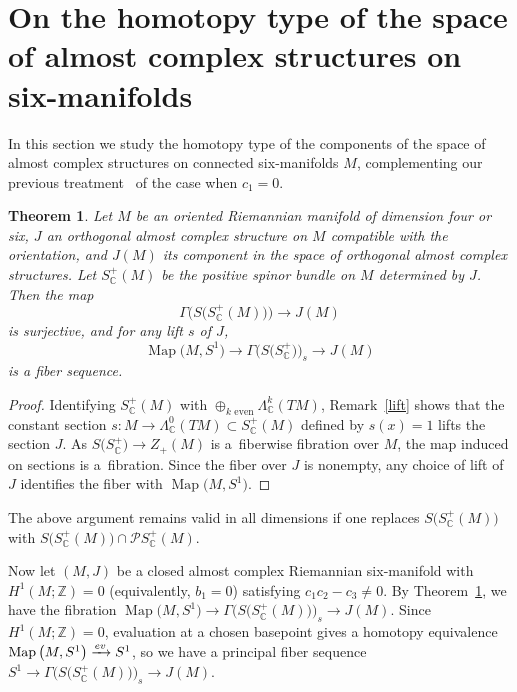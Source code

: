 \documentclass[11pt]{article}
\numberwithin{equation}{section}
\newcommand{\ZZ}{\mathbb{Z}}
\newcommand{\C}{\mathbb{C}}
\DeclareMathOperator{\Map}{Map}
\numberwithin{equation}{section}
\newtheorem{Theorem}{Theorem}[section]
\begin{document}
\setcounter{section}{3}
\section[On the homotopy type of the space of almost complex structures on six-manifolds]{On the homotopy type of the space\\ of almost complex structures on six-manifolds}

In this section we study the homotopy type of the components of the space of almost complex structures on connected six-manifolds $M$, complementing our previous treatment~\cite{FGM21} of the case when $c_1=0$.

\begin{Theorem}\label{fibration}
Let $M$ be an oriented Riemannian manifold of dimension four or six, $J$ an orthogonal almost complex structure on $M$ compatible with the orientation, and $J(M)$ its component in the space of orthogonal almost complex structures. Let $S_{\C}^+(M)$ be the positive spinor bundle on $M$ determined by $J$. Then the map
\[
\Gamma\big( S\big(S_\C^+(M)\big)\big) \to J(M)
\]
is surjective, and for any lift $s$ of $J$,
\[
\Map\big(M,S^1\big) \to \Gamma\big( S\big(S_\C^+\big)\big)_s \to J(M)
\]
is a fiber sequence.
\end{Theorem}
\begin{proof}
Identifying $S_\C^+(M)$ with $\oplus_{k \text{ even}} \Lambda^k_\C(TM)$, Remark~\ref{lift} shows that
the constant section $s \colon M \to \Lambda^0_\C(TM) \subset S_\C^+(M)$ defined by
$s(x)=1$ lifts the section $J$. As $S\big(S_\C^+\big) \to Z_+(M)$ is a~fiberwise fibration over $M$, the map induced on sections is a~fibration. Since the fiber over $J$ is nonempty, any choice of lift of $J$ identifies the
fiber with $\Map\big(M,S^1\big)$.
\end{proof}

\begin{Remark} The above argument remains valid in all dimensions if one replaces $S\big(S_{\C}^+(M)\big)$ with $S\big(S_{\C}^+(M)\big) \cap {\mathcal P}S ^+_{\C}(M)$. \end{Remark}

Now let $(M,J)$ be a closed almost complex Riemannian six-manifold with $H^1(M;\ZZ) = 0$ (equivalently, $b_1 = 0$) satisfying $c_1c_2 - c_3 \neq 0$. By Theorem~\ref{fibration}, we have the fibration $\Map\big(M,S^1\big) \to \Gamma\big( S\big(S_\C^+(M)\big)\big)_s \to J(M)$. Since $H^1(M;\ZZ) = 0$, evaluation at a chosen basepoint gives a homotopy equivalence $\Map\big(M,S^1\big) \xrightarrow{{\rm ev}} S^1$, so we have a principal fiber sequence $S^1 \to \Gamma\big(S\big(S_\C^+(M)\big)\big)_s \to J(M)$.
\end{document}
